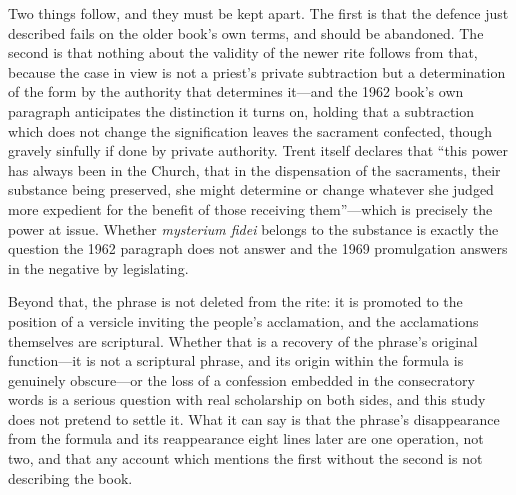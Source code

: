 Two things follow, and they must be kept apart. The first is that the defence just described fails on the older book's own terms, and should be abandoned. The second is that nothing about the validity of the newer rite follows from that, because the case in view is not a priest's private subtraction but a determination of the form by the authority that determines it---and the 1962 book's own paragraph anticipates the distinction it turns on, holding that a subtraction which does not change the signification leaves the sacrament confected, though gravely sinfully if done by private authority. Trent itself declares that ``this power has always been in the Church, that in the dispensation of the sacraments, their substance being preserved, she might determine or change whatever she judged more expedient for the benefit of those receiving them''---which is precisely the power at issue. Whether \emph{mysterium fidei} belongs to the substance is exactly the question the 1962 paragraph does not answer and the 1969 promulgation answers in the negative by legislating.

Beyond that, the phrase is not deleted from the rite: it is promoted to the position of a versicle inviting the people's acclamation, and the acclamations themselves are scriptural. Whether that is a recovery of the phrase's original function---it is not a scriptural phrase, and its origin within the formula is genuinely obscure---or the loss of a confession embedded in the consecratory words is a serious question with real scholarship on both sides, and this study does not pretend to settle it. What it can say is that the phrase's disappearance from the formula and its reappearance eight lines later are one operation, not two, and that any account which mentions the first without the second is not describing the book.

